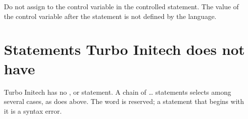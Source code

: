 Do not assign to the control variable in the controlled statement.  The
value of the control variable after the  statement is not defined
by the language.



\section{Statements Turbo Initech does not have}
Turbo Initech has no ,  or  statement.  A
chain of  \dots{}   statements selects among several
cases, as  does above.  The word  is reserved; a
statement that begins with it is a syntax error.
